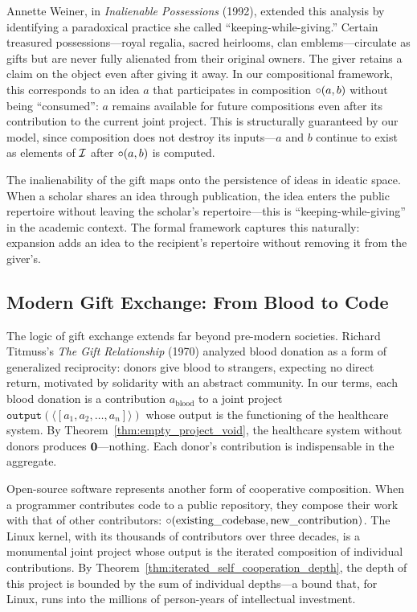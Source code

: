 Annette Weiner, in \textit{Inalienable Possessions} (1992), extended
this analysis by identifying a paradoxical practice she called
``keeping-while-giving.''  Certain treasured possessions---royal
regalia, sacred heirlooms, clan emblems---circulate as gifts but are
never fully alienated from their original owners.  The giver retains
a claim on the object even after giving it away.  In our compositional
framework, this corresponds to an idea $a$ that participates in
composition $\circ(a, b)$ without being ``consumed'': $a$ remains
available for future compositions even after its contribution to the
current joint project.  This is structurally guaranteed by our model,
since composition does not destroy its inputs---$a$ and $b$ continue
to exist as elements of $\mathcal{I}$ after $\circ(a, b)$ is computed.

The inalienability of the gift maps onto the persistence of ideas in
ideatic space.  When a scholar shares an idea through publication, the
idea enters the public repertoire without leaving the scholar's
repertoire---this is ``keeping-while-giving'' in the academic context.
The formal framework captures this naturally: expansion adds an idea
to the recipient's repertoire without removing it from the giver's.

\subsection*{Modern Gift Exchange: From Blood to Code}

The logic of gift exchange extends far beyond pre-modern societies.
Richard Titmuss's \textit{The Gift Relationship} (1970) analyzed blood
donation as a form of generalized reciprocity: donors give blood to
strangers, expecting no direct return, motivated by solidarity with an
abstract community.  In our terms, each blood donation is a contribution
$a_{\text{blood}}$ to a joint project
$\texttt{output}(\langle [a_1, a_2, \ldots, a_n] \rangle)$ whose
output is the functioning of the healthcare system.  By
Theorem~\ref{thm:empty_project_void}, the healthcare system without
donors produces $\mathbf{0}$---nothing.  Each donor's contribution is
indispensable in the aggregate.

Open-source software represents another form of cooperative
composition.  When a programmer contributes code to a public
repository, they compose their work with that of other contributors:
$\circ(\text{existing\_codebase}, \text{new\_contribution})$.  The
Linux kernel, with its thousands of contributors over three decades,
is a monumental joint project whose output is the iterated composition
of individual contributions.  By
Theorem~\ref{thm:iterated_self_cooperation_depth}, the depth of this
project is bounded by the sum of individual depths---a bound that, for
Linux, runs into the millions of person-years of intellectual investment.

